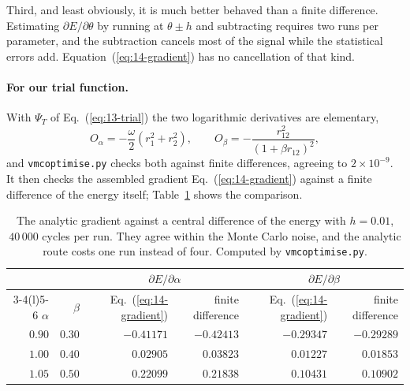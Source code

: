 Third, and least obviously, it is much better behaved than a finite
difference.  Estimating $\partial E/\partial\theta$ by running at
$\theta\pm h$ and subtracting requires two runs per parameter, and the
subtraction cancels most of the signal while the statistical errors add.
Equation~(\ref{eq:14-gradient}) has no cancellation of that kind.

\paragraph{For our trial function.}
With $\Psi_T$ of Eq.~(\ref{eq:13-trial}) the two logarithmic derivatives are
elementary,
\begin{equation}
  O_{\alpha} = -\frac{\omega}{2}\left(r_1^2+r_2^2\right),
  \qquad
  O_{\beta} = -\frac{r_{12}^2}{\left(1+\beta r_{12}\right)^2} ,
  \label{eq:14-Odot}
\end{equation}
and \texttt{vmcoptimise.py} checks both against finite differences, agreeing
to $2\times10^{-9}$.  It then checks the assembled gradient
Eq.~(\ref{eq:14-gradient}) against a finite difference of the energy itself;
Table~\ref{tab:14-gradient} shows the comparison.

\begin{table}[h]
\centering
\renewcommand{\arraystretch}{1.25}
\setlength{\tabcolsep}{10pt}
\begin{tabular}{rrrrrr}
\toprule
& & \multicolumn{2}{c}{$\partial E/\partial\alpha$} &
    \multicolumn{2}{c}{$\partial E/\partial\beta$}\\
\cmidrule(lr){3-4}\cmidrule(l){5-6}
$\alpha$ & $\beta$ & Eq.~(\ref{eq:14-gradient}) & finite difference
 & Eq.~(\ref{eq:14-gradient}) & finite difference\\
\midrule
$0.90$ & $0.30$ & $-0.41171$ & $-0.42413$ & $-0.29347$ & $-0.29289$\\
$1.00$ & $0.40$ & $\phantom{-}0.02905$ & $\phantom{-}0.03823$ &
  $\phantom{-}0.01227$ & $\phantom{-}0.01853$\\
$1.05$ & $0.50$ & $\phantom{-}0.22099$ & $\phantom{-}0.21838$ &
  $\phantom{-}0.10431$ & $\phantom{-}0.10902$\\
\bottomrule
\end{tabular}
\caption{The analytic gradient against a central difference of the energy with
$h=0.01$, $40\,000$ cycles per run.  They agree within the Monte Carlo noise,
and the analytic route costs one run instead of four.  Computed by
\texttt{vmcoptimise.py}.}
\label{tab:14-gradient}
\end{table}

